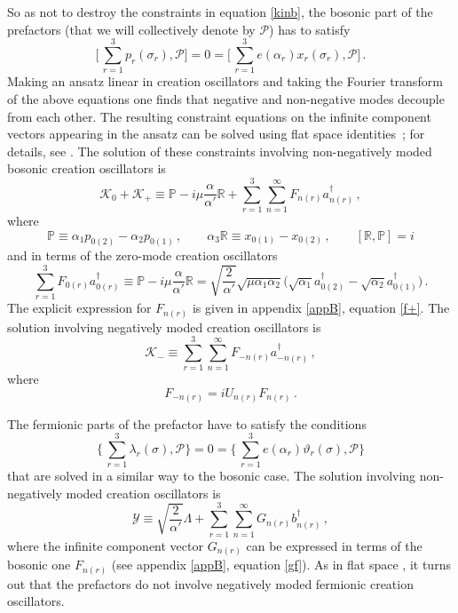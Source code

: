 \documentclass[12pt]{article}
\def\L{\Lambda}
\def\a{\alpha}
\def\m{\mu}
\def\s{\sigma}
\def\l{\lambda}
\def\vt{\vartheta}
\def\mc{\mathcal}
\def\dg{\dagger}
\numberwithin{equation}{section} \setlength{\textwidth}{17cm}
\begin{document}
\noindent
So as not to destroy the constraints in equation \eqref{kinb}, 
the bosonic part of the prefactors (that we will collectively denote by ${\mc P}$) has to
satisfy~\cite{gs,gsb}
\begin{equation}\label{bospre}
\bigl[\,\sum_{r=1}^3p_r(\s_r),{\mc P}\bigr]=0
=\bigl[\,\sum_{r=1}^3e(\a_r)x_r(\s_r),\mc{P}\bigr]\,.
\end{equation}
Making an ansatz linear in creation oscillators and taking the Fourier transform of the above
equations one finds that negative and non-negative modes decouple from each other. The
resulting constraint equations on the infinite component vectors appearing in the ansatz
can be solved using flat space identities~\cite{gs}; for details, see \cite{sv2,ap}.
The solution of these constraints involving non-negatively moded bosonic creation oscillators is \cite{sv2}
\begin{equation}\label{k+mode}
{\mc K}_0+{\mc K}_+\equiv
\mathbb{P}-i\m\frac{\a}{\a'}\mathbb{R}
+\sum_{r=1}^3\sum_{n=1}^{\infty}F_{n(r)}a^{\dg}_{n(r)}\,,
\end{equation}
where
\begin{equation}
\mathbb{P}\equiv\a_1p_{0(2)}-\a_2p_{0(1)}\,,\qquad
\a_3\mathbb{R}\equiv x_{0(1)}-x_{0(2)}\,,\qquad [\mathbb{R},\mathbb{P}]=i
\end{equation}
and in terms of the zero-mode creation oscillators
\begin{equation}
\sum_{r=1}^3F_{0(r)}a_{0(r)}^{\dg}\equiv\mathbb{P}-i\m\frac{\a}{\a'}\mathbb{R}=
\sqrt{\frac{2}{\a'}}\sqrt{\m\a_1\a_2}
\bigl(\sqrt{\a_1}a_{0(2)}^{\dg}-\sqrt{\a_2}a_{0(1)}^{\dg}\bigr)\,.
\end{equation}
The explicit expression for $F_{n(r)}$ is given in appendix \ref{appB}, equation \eqref{f+}.
The solution involving negatively moded creation oscillators is
\begin{equation}\label{k-mode}
{\mc K}_-\equiv\sum_{r=1}^3\sum_{n=1}^{\infty}F_{-n(r)}a^{\dg}_{-n(r)}\,,
\end{equation}
where
\begin{equation}\label{negf}
F_{-n(r)}=iU_{n(r)}F_{n(r)}\,.
\end{equation}

\noindent The fermionic parts of the prefactor have to satisfy the conditions
\begin{equation}\label{ferpre}
\bigl\{\,\sum_{r=1}^3\l_r(\s),{\mc P}\bigr\}=0=
\bigl\{\,\sum_{r=1}^3e(\a_r)\vt_r(\s),\mc{P}\bigr\}
\end{equation}
that are solved in a similar way to the bosonic case.
The solution involving non-negatively moded creation oscillators is
\begin{equation}\label{ymode}
{\mc Y}\equiv\sqrt{\frac{2}{\a'}}\L
+\sum_{r=1}^3\sum_{n=1}^{\infty}G_{n(r)}b^{\dg}_{n(r)}\,,
\end{equation}
where the infinite component vector $G_{n(r)}$ can be expressed in terms of the
bosonic one $F_{n(r)}$ \cite{ap} (see appendix \ref{appB}, equation \eqref{gf}).
As in flat space \cite{gs,gsb}, it turns out that the prefactors
do not involve negatively moded fermionic creation oscillators.
\end{document}
